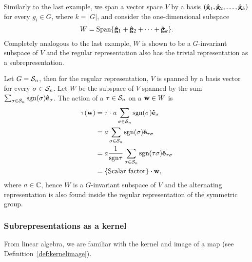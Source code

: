\begin{example}\cite[Example 1.4.4.]{Sagan}
	Similarly to the last example, we span a vector space $V$ by a basis $(\mathbf{\hat{g}}_1, \mathbf{\hat{g}}_2, \dots, \mathbf{\hat{g}}_{k})$ for every $g_i \in G$, where $k = |G|$, and consider the one-dimensional subspace 
	\begin{align*}
		W = \text{Span}\{ \mathbf{\hat{g}}_1 + \mathbf{\hat{g}}_2 + \dots + \mathbf{\hat{g}}_k \}. 
	\end{align*}
	Completely analogous to the last example, $W$ is shown to be a $G$-invariant subspace of $V$ and the regular representation also has the trivial representation as a subrepresentation.
\end{example}

\begin{example}\cite[Example 1.4.4.]{Sagan}
	Let $G = \mathcal{S}_n$, then for the regular representation, $V$ is spanned by a basis vector for every $\sigma \in \mathcal{S}_n$. Let $W$ be the subspace of $V$ spanned by the sum $\sum_{\sigma \in \mathcal{S}_n} \text{sgn}(\sigma) \mathbf{\hat{e}}_{\sigma}$. The action of a $\tau \in \mathcal{S}_n$ on a $\mathbf{w} \in W$ is
	\begin{align*}
		\tau (\mathbf{w}) &= \tau \cdot a\sum_{\sigma \in \mathcal{S}_n} \text{sgn}(\sigma) \mathbf{\hat{e}}_{\sigma} \\
		&= a \sum_{\sigma \in \mathcal{S}_n} \text{sgn}(\sigma) \mathbf{\hat{e}}_{\tau\sigma} \\
		&= a \frac{1}{\text{sgn}\tau} \sum_{\sigma \in \mathcal{S}_n} \text{sgn}(\tau\sigma) \mathbf{\hat{e}}_{\tau\sigma}  \\
		&= \{\text{Scalar factor}\} \cdot \mathbf{w},
	\end{align*}
	where $a \in \mathbb{C}$, hence $W$ is a $G$-invariant subspace of $V$ and the alternating representation is also found inside the regular representation of the symmetric group.
\end{example}

\subsubsection{Subrepresentations as a kernel}

From linear algebra, we are familiar with the kernel and image of a map (see Definition~\ref{def:kernelimage}).

